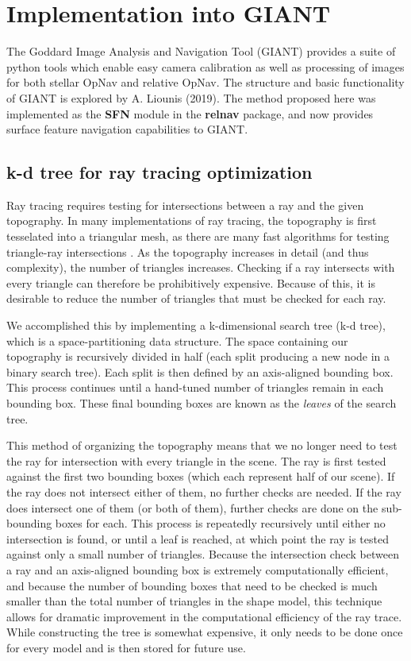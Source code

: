 \documentclass{src/RPI-SIW}
\begin{document}
\section*{Implementation into GIANT}
The Goddard Image Analysis and Navigation Tool (GIANT) provides a suite of python tools which enable easy camera calibration as well as processing of images for both stellar OpNav and relative OpNav. The structure and basic functionality of GIANT is explored by A. Liounis (2019).\cite{giant}  The method proposed here was implemented as the \textbf{SFN} module in the \textbf{relnav} package, and now provides surface feature navigation capabilities to GIANT.

\subsection*{k-d tree for ray tracing optimization}
Ray tracing requires testing for intersections between a ray and the given topography.  In many implementations of ray tracing, the topography is first tesselated into a triangular mesh, as there are many fast algorithms for testing triangle-ray intersections \cite{triangle_ray}.  As the topography increases in detail (and thus complexity), the number of triangles increases.  Checking if a ray intersects with every triangle can therefore be prohibitively expensive.  Because of this, it is desirable to reduce the number of triangles that must be checked for each ray.

We accomplished this by implementing a k-dimensional search tree (k-d tree), which is a space-partitioning data structure.  The space containing our topography is recursively divided in half (each split producing a new node in a binary search tree).  Each split is then defined by an axis-aligned bounding box.  This process continues until a hand-tuned number of triangles remain in each bounding box.  These final bounding boxes are known as the \textit{leaves} of the search tree.

This method of organizing the topography means that we no longer need to test the ray for intersection with every triangle in the scene.  The ray is first tested against the first two bounding boxes (which each represent half of our scene).  If the ray does not intersect either of them, no further checks are needed.  If the ray does intersect one of them (or both of them), further checks are done on the sub-bounding boxes for each.  This process is repeatedly recursively until either no intersection is found, or until a leaf is reached, at which point the ray is tested against only a small number of triangles.  Because the intersection check between a ray and an axis-aligned bounding box is extremely computationally efficient, and because the number of bounding boxes that need to be checked is much smaller than the total number of triangles in the shape model, this technique allows for dramatic improvement in the computational efficiency of the ray trace. 
While constructing the tree is somewhat expensive, it only needs to be done once for every model and is then stored for future use.
\end{document}
